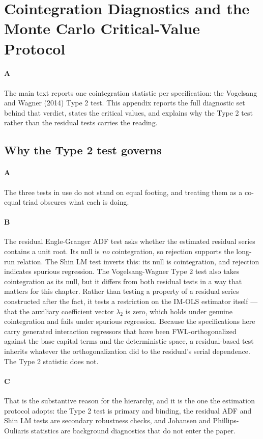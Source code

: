 \section{Cointegration Diagnostics and the Monte Carlo Critical-Value Protocol}

\paragraph{A}
The main text reports one cointegration statistic per specification: the Vogelsang and Wagner (2014) Type 2 test. This appendix reports the full diagnostic set behind that verdict, states the critical values, and explains why the Type 2 test rather than the residual tests carries the reading.

\subsection{Why the Type 2 test governs}

\paragraph{A}
The three tests in use do not stand on equal footing, and treating them as a co-equal triad obscures what each is doing.

\paragraph{B}
The residual Engle-Granger ADF test asks whether the estimated residual series contains a unit root. Its null is \textit{no} cointegration, so rejection supports the long-run relation. The Shin LM test inverts this: its null is cointegration, and rejection indicates spurious regression. The Vogelsang-Wagner Type 2 test also takes cointegration as its null, but it differs from both residual tests in a way that matters for this chapter. Rather than testing a property of a residual series constructed after the fact, it tests a restriction on the IM-OLS estimator itself — that the auxiliary coefficient vector $\lambda_2$ is zero, which holds under genuine cointegration and fails under spurious regression. Because the specifications here carry generated interaction regressors that have been FWL-orthogonalized against the base capital terms and the deterministic space, a residual-based test inherits whatever the orthogonalization did to the residual's serial dependence. The Type 2 statistic does not.

\paragraph{C}
That is the substantive reason for the hierarchy, and it is the one the estimation protocol adopts: the Type 2 test is primary and binding, the residual ADF and Shin LM tests are secondary robustness checks, and Johansen and Phillips-Ouliaris statistics are background diagnostics that do not enter the paper.

